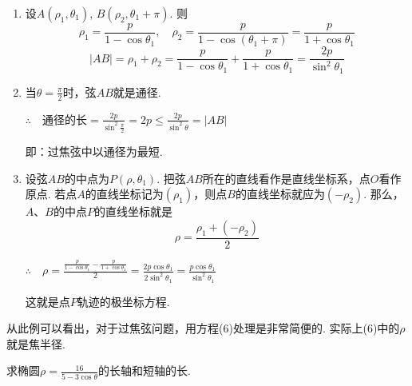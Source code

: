\begin{solution}
\begin{enumerate}[(1)]
    \item 设$A(\rho_1,\theta_1)$, $B(\rho_2,\theta_1+\pi)$. 则
\[\rho_1=\frac{p}{1-\cos\theta_1},\quad \rho_2=\frac{p}{1-\cos(\theta_1+\pi)}=\frac{p}{1+\cos\theta_1}\]
\[|AB|=\rho_1+\rho_2=\frac{p}{1-\cos\theta_1}+\frac{p}{1+\cos\theta_1}=\frac{2p}{\sin^2\theta_1}\]

    \item 当$\theta=\frac{\pi}{2}$时，弦$AB$就是通径.
    
$\therefore\quad $通径的长$=\frac{2p}{\sin^2\frac{\pi}{2}}=2p\le \frac{2p}{\sin^2\theta}=|AB|$

即：过焦弦中以通径为最短.
\item 设弦$AB$的中点为$P(\rho,\theta_1)$. 把弦$AB$所在的直线看作是直线坐标系，点$O$看作原点. 若点$A$的直线坐标记为$(\rho_1)$，则点$B$的直线坐标就应为$(-\rho_2)$. 那么，$A$、$B$的中点$P$的直线坐标就是
\[\rho=\frac{\rho_1+(-\rho_2)}{2}\]

$\therefore\quad \rho=\frac{\frac{p}{1-\cos\theta_1}-\frac{p}{1+\cos\theta_1}}{2}=\frac{2p\cos\theta_1}{2\sin^2\theta_1}=\frac{p\cos\theta_1}{\sin^2\theta_1}$

这就是点$P$轨迹的极坐标方程.
\end{enumerate}
    
\end{solution}

\begin{rmk}
从此例可以看出，对于过焦弦问题，用方程(6)处理是非常简便的. 实际上(6)中的$\rho$就是焦半径.  
\end{rmk}

\begin{example}
    求椭圆$\rho=\frac{16}{5-3\cos\theta}$的长轴和短轴的长.
\end{example}

